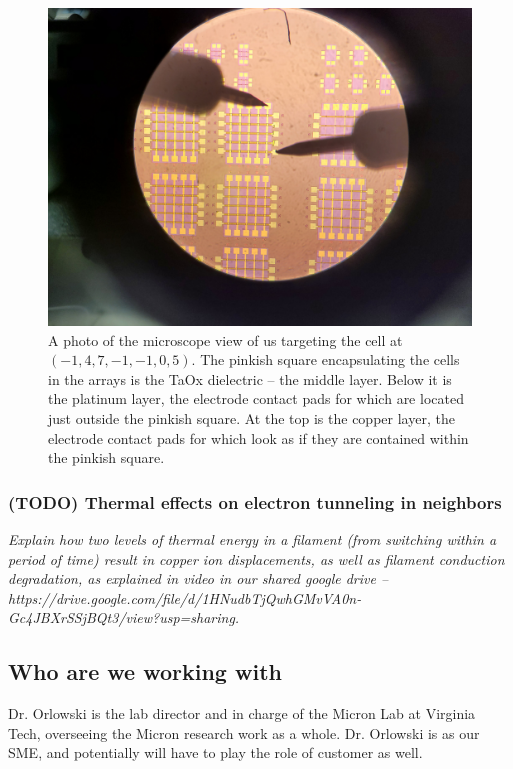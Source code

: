 \documentclass{article}
\begin{document}
          \begin{figure}[H]
            \centering
            \includegraphics[width=\textwidth]{figures/microscope_grid_3.jpg}
            \caption{A photo of the microscope view of us targeting the cell at $(-1, 4, 7, -1, -1, 0, 5)$. The pinkish
              square encapsulating the cells in the arrays is the TaOx dielectric -- the middle layer. Below it is the
              platinum layer, the electrode contact pads for which are located just outside the pinkish square. At the
              top is the copper layer, the electrode contact pads for which look as if they are contained within the
              pinkish square.}
            \label{grid_3}
          \end{figure}

        \newpage
        \subsubsection{(TODO) Thermal effects on electron tunneling in neighbors}
            
          \textit{Explain how two levels of thermal energy in a filament (from switching within a period of time) result
            in copper ion displacements, as well as filament conduction degradation, as explained in video in our shared
            google drive -- https://drive.google.com/file/d/1HNudbTjQwhGMvVA0n-Gc4JBXrSSjBQt3/view?usp=sharing.}    
      
      \newpage
      \subsection{Who are we working with}
        Dr. Orlowski is the lab director and in charge of the Micron Lab at Virginia Tech, overseeing the Micron
        research work as a whole. Dr. Orlowski is as our SME, and potentially will have to play the role of customer as
        well.
\end{document}
